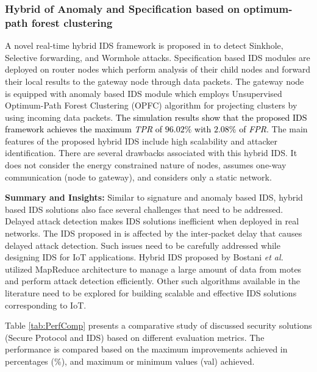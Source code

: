 \documentclass[10pt,journal,sort & compress]{IEEEtran}
\begin{document}
\subsubsection*{Hybrid of Anomaly and Specification based on optimum-path forest clustering} 
A novel real-time hybrid IDS framework is proposed in \cite{Bostani2017} to detect Sinkhole, Selective forwarding, and Wormhole attacks. Specification based IDS modules are deployed on router nodes which perform analysis of their child nodes and forward their local results to the gateway node through data packets. The gateway node is equipped with anomaly based IDS module which employs Unsupervised Optimum-Path Forest Clustering (OPFC) algorithm for projecting clusters by using incoming data packets. \textcolor{black}{The simulation results show that the proposed IDS framework achieves the maximum \textit{TPR} of $ 96.02\% $ with $ 2.08\% $ of \textit{FPR}.} The main features of the proposed hybrid IDS include high scalability and attacker identification. There are several drawbacks associated with this hybrid IDS. It does not consider the energy constrained nature of nodes, assumes one-way communication (node to gateway), and considers only a static network. 

\textbf{Summary and Insights:} Similar to signature and anomaly based IDS, hybrid based IDS solutions also face several challenges that need to be addressed. Delayed attack detection makes IDS solutions inefficient when deployed in real networks. The IDS proposed in \cite{RIDES} is affected by the inter-packet delay that causes delayed attack detection. Such issues need to be carefully addressed while designing IDS for IoT applications. Hybrid IDS proposed by Bostani \textit{et al.} \cite{Bostani2017} utilized MapReduce architecture to manage a large amount of data from motes and perform attack detection efficiently. Other such algorithms available in the literature need to be explored for building scalable and effective IDS solutions corresponding to IoT.

Table \ref{tab:PerfComp} presents a comparative study of discussed security solutions (Secure Protocol and IDS) based on different evaluation metrics. The performance is compared based on the maximum improvements achieved in percentages (\%), and maximum or minimum values (val) achieved. 
\end{document}
